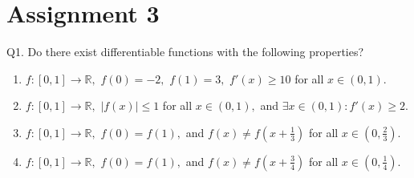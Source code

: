 \documentclass[12pt]{article}
\theoremstyle{definition}
\newcommand{\md}[1]{\left\lvert #1 \right\lvert}
\begin{document}
\section{Assignment 3}
Q1. Do there exist differentiable functions with the following properties?
\begin{enumerate}
	\item $f:[0, 1] \to \mathbb{R},$ $f(0) = -2,$ $f(1) = 3,$ $f'(x) \ge 10$ for all $x \in (0, 1).$
	\item $f:[0, 1] \to \mathbb{R},$ $\md{f(x)} \le 1$ for all $x \in (0, 1),$ and $\exists x \in (0, 1) : f'(x) \ge 2.$
	\item $f:[0, 1] \to \mathbb{R},$ $f(0) = f(1),$ and $f(x) \neq f\left(x + \frac{1}{3}\right)$ for all $x \in \left(0, \frac{2}{3}\right).$
	\item $f:[0, 1] \to \mathbb{R},$ $f(0) = f(1),$ and $f(x) \neq f\left(x + \frac{3}{4}\right)$ for all $x \in \left(0, \frac{1}{4}\right).$
\end{enumerate}
\end{document}
